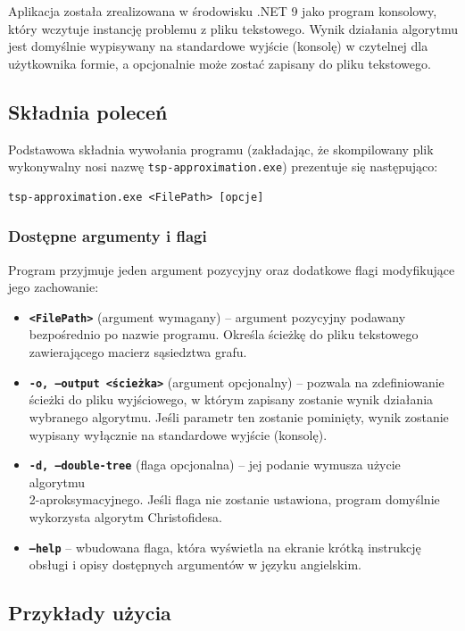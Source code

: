 \documentclass{article}
\theoremstyle{definition}
\theoremstyle{plain}
\theoremstyle{remark}
\begin{document}
Aplikacja została zrealizowana w środowisku .NET 9 jako program konsolowy, który wczytuje instancję problemu z pliku tekstowego. Wynik działania algorytmu jest domyślnie wypisywany na standardowe wyjście (konsolę) w czytelnej dla użytkownika formie, a opcjonalnie może zostać zapisany do pliku tekstowego.

\subsection{Składnia poleceń}

Podstawowa składnia wywołania programu (zakładając, że skompilowany plik wykonywalny nosi nazwę \texttt{tsp-approximation.exe}) prezentuje się następująco:

\begin{verbatim}
tsp-approximation.exe <FilePath> [opcje]
\end{verbatim}

\subsubsection{Dostępne argumenty i flagi}

Program przyjmuje jeden argument pozycyjny oraz dodatkowe flagi modyfikujące jego zachowanie:

\begin{itemize}
    \item \textbf{\texttt{<FilePath>}} (argument wymagany) -- argument pozycyjny podawany bezpośrednio po nazwie programu. Określa ścieżkę do pliku tekstowego zawierającego macierz sąsiedztwa grafu.
    \item \textbf{\texttt{-o, ---output <ścieżka>}} (argument opcjonalny) -- pozwala na zdefiniowanie ścieżki do pliku wyjściowego, w którym zapisany zostanie wynik działania wybranego algorytmu. Jeśli parametr ten zostanie pominięty, wynik zostanie wypisany wyłącznie na standardowe wyjście (konsolę).
    \item \textbf{\texttt{-d, ---double-tree}} (flaga opcjonalna) -- jej podanie wymusza użycie algorytmu \\ 2-aproksymacyjnego. Jeśli flaga nie zostanie ustawiona, program domyślnie wykorzysta algorytm Christofidesa.
    \item \textbf{\texttt{---help}} -- wbudowana flaga, która wyświetla na ekranie krótką instrukcję obsługi i opisy dostępnych argumentów w języku angielskim.
\end{itemize}

\subsection{Przykłady użycia}
\end{document}
